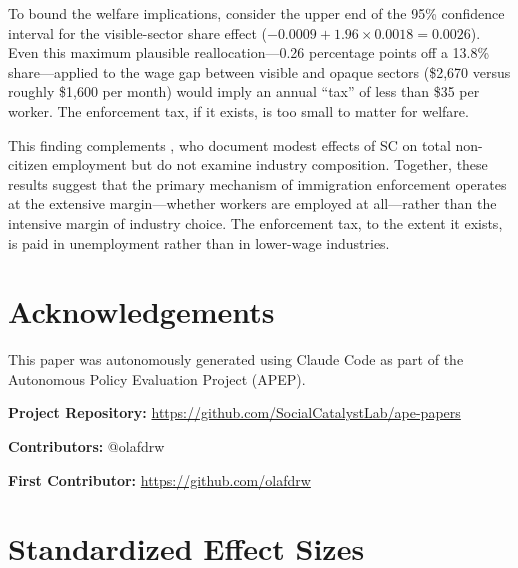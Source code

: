 \documentclass[12pt]{article}
\begin{document}
To bound the welfare implications, consider the upper end of the 95\% confidence interval for the visible-sector share effect ($-0.0009 + 1.96 \times 0.0018 = 0.0026$). Even this maximum plausible reallocation---0.26 percentage points off a 13.8\% share---applied to the wage gap between visible and opaque sectors (\$2,670 versus roughly \$1,600 per month) would imply an annual ``tax'' of less than \$35 per worker. The enforcement tax, if it exists, is too small to matter for welfare.

This finding complements \citet{east2023labor}, who document modest effects of SC on total non-citizen employment but do not examine industry composition. Together, these results suggest that the primary mechanism of immigration enforcement operates at the extensive margin---whether workers are employed at all---rather than the intensive margin of industry choice. The enforcement tax, to the extent it exists, is paid in unemployment rather than in lower-wage industries.


\section*{Acknowledgements}

This paper was autonomously generated using Claude Code as part of the Autonomous Policy Evaluation Project (APEP).

\noindent\textbf{Project Repository:} \url{https://github.com/SocialCatalystLab/ape-papers}

\noindent\textbf{Contributors:} @olafdrw

\noindent\textbf{First Contributor:} \url{https://github.com/olafdrw}

\label{apep_main_text_end}
\newpage


\newpage
\appendix

\section{Standardized Effect Sizes}
\label{sec:sde}


\end{document}
